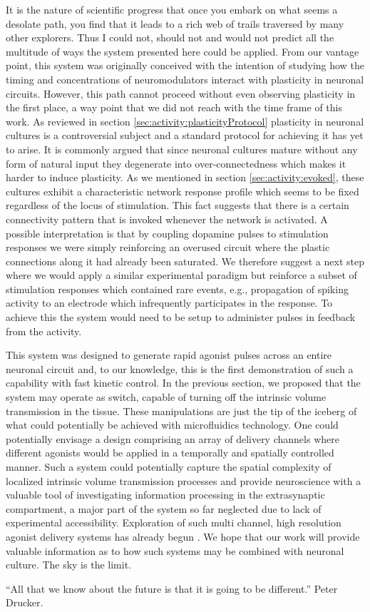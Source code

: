 It is the nature of scientific progress that once you embark on what seems a desolate path, you find that it leads to a rich web of trails traversed by many other explorers. Thus I could not, should not and would not predict all the multitude of ways the system presented here could be applied. From our vantage point, this system was originally conceived with the intention of studying how the timing and concentrations of neuromodulators interact with plasticity in neuronal circuits. However, this path cannot proceed without even observing plasticity in the first place, a way point that we did not reach with the time frame of this work. As reviewed in section \ref{sec:activity:plasticityProtocol} plasticity in neuronal cultures is a controversial subject and a standard protocol for achieving it has yet to arise. It is commonly argued that since neuronal cultures mature without any form of natural input they degenerate into over-connectedness which makes it harder to induce plasticity. As we mentioned in section \ref{sec:activity:evoked}, these cultures exhibit a characteristic network response profile which seems to be fixed regardless of the locus of stimulation. This fact suggests that there is a certain connectivity pattern that is invoked whenever the network is activated. A possible interpretation is that by coupling dopamine pulses to stimulation responses we were simply reinforcing an overused circuit where the plastic connections along it had already been saturated. We therefore suggest a next step where we would apply a similar experimental paradigm but reinforce a subset of stimulation responses which contained rare events, e.g., propagation of spiking activity to an electrode which infrequently participates in the response. To achieve this the system would need to be setup to administer pulses in feedback from the activity.

This system was designed to generate rapid agonist pulses across an entire neuronal circuit and, to our knowledge, this is the first demonstration of such a capability with fast kinetic control. In the previous section, we proposed that the system may operate as switch, capable of turning off the intrinsic volume transmission in the tissue. These manipulations are just the tip of the iceberg of what could potentially be achieved with microfluidics technology. One could potentially envisage a design comprising an array of delivery channels where different agonists would be applied in a temporally and spatially controlled manner. Such a system could potentially capture the spatial complexity of localized intrinsic volume transmission processes and provide neuroscience with a valuable tool of investigating information processing in the extrasynaptic compartment, a major part of the system so far neglected due to lack of experimental accessibility. Exploration of such multi channel, high resolution agonist delivery systems has already begun \cite{scott2013microfluidic}. We hope that our work will provide valuable information as to how such systems may be combined with neuronal culture. The sky is the limit.

\vspace{1cm}
``All that we know about the future is that it is going to be different.'' Peter Drucker. 